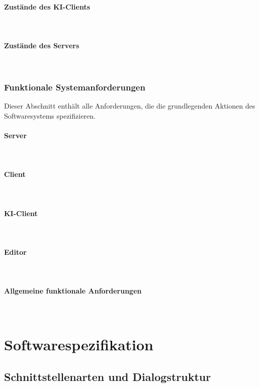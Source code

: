 \documentclass{uulm-assignment}
\begin{document}
\paragraph{Zustände des KI-Clients} \mbox{}\\

\paragraph{Zustände des Servers} \mbox{}\\


\clearpage
\subsubsection{Funktionale Systemanforderungen}
Dieser Abschnitt enthält alle Anforderungen, die die grundlegenden Aktionen des Softwaresystems spezifizieren.
\paragraph{Server} \mbox{}\\

\paragraph{Client} \mbox{}\\

\paragraph{KI-Client} \mbox{}\\

\paragraph{Editor} \mbox{}\\

\paragraph{Allgemeine funktionale Anforderungen} \mbox{}\\


\clearpage
\section{Softwarespezifikation}
\subsection{Schnittstellenarten und Dialogstruktur}
\end{document}

